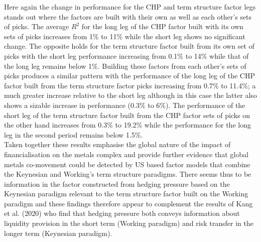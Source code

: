 \documentclass[]{elsarticle} %
\begin{document}
Here again the change in performance for the CHP and term structure factor legs stands out where the factors are built with their own as well as each other's sets of picks. The average \(R^{2}\) for the long leg of the CHP factor built with its own sets of picks increases from 1\% to 11\% while the short leg shows no significant change. The opposite holds for the term structure factor built from its own set of picks with the short leg performance increasing from 0.1\% to 14\% while that of the long leg remains below 1\%. Building these factors from each other's sets of picks produces a similar pattern with the performance of the long leg of the CHP factor built from the term structure factor picks increasing from 0.7\% to 11.4\%; a much greater increase relative to the short leg although in this case the latter also shows a sizable increase in performance (0.3\% to 6\%). The performance of the short leg of the term structure factor built from the CHP factor sets of picks on the other hand increases from 0.3\% to 19.2\% while the performance for the long leg in the second period remains below 1.5\%.\\
Taken together these results emphasise the global nature of the impact of financialisation on the metals complex and provide further evidence that global metals co-movement could be detected by US based factor models that combine the Keynesian and Working's term structure paradigms. There seems thus to be information in the factor constructed from hedging pressure based on the Keynesian paradigm relevant to the term structure factor built on the Working paradigm and these findings therefore appear to complement the results of Kang et al. (2020) who find that hedging pressure both conveys information about liquidity provision in the short term (Working paradigm) and risk transfer in the longer term (Keynesian paradigm).

\bigskip\bigskip\setlength{\parindent}{0pt}
\end{document}
